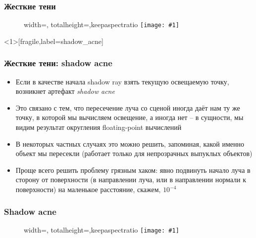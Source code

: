 \documentclass[10pt,handout]{beamer}
\newcommand{\slideimage}[1]{
  \begin{figure}
    \begin{adjustbox}{width=\textwidth, totalheight=\textheight-2\baselineskip-2\baselineskip,keepaspectratio}
      \texttt{[image: \#1]}
    \end{adjustbox}
  \end{figure}
}
\begin{document}
\begin{frame}[fragile]
\frametitle{Жесткие тени}
\slideimage{shadows.png}
\end{frame}

\begin{frame}<1>[fragile,label=shadow_acne]
\frametitle{Жесткие тени: shadow acne}
\begin{itemize}
\item Если в качестве начала shadow ray взять текущую освещаемую точку, возникнет артефакт \textit{shadow acne}
\pause
\item Это связано с тем, что пересечение луча со сценой иногда даёт нам ту же точку, в которой мы вычисляем освещение, а иногда нет -- в сущности, мы видим результат округления floating-point вычислений
\pause
\item В некоторых частных случаях это можно решить, запоминая, какой именно объект мы пересекли (работает только для непрозрачных выпуклых объектов)
\pause
\item Проще всего решить проблему грязным хаком: явно подвинуть начало луча в сторону от поверхности (в направлении луча, или в направлении нормали к поверхности) на маленькое расстояние, скажем, \begin{math}10^{-4}\end{math}
\end{itemize}
\end{frame}

\begin{frame}[fragile]
\frametitle{Shadow acne}
\slideimage{shadow_acne.png}
\end{frame}

\end{document}
